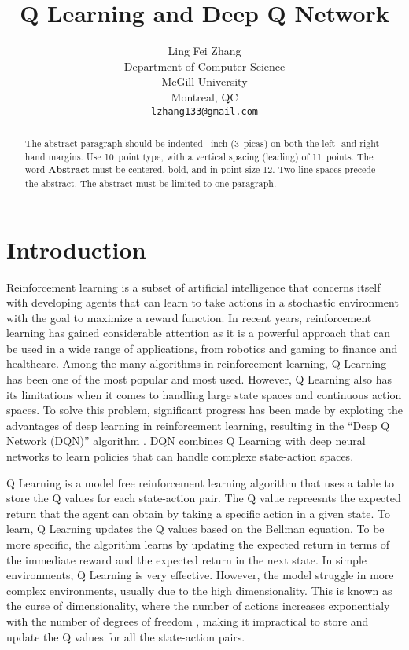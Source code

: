 \documentclass{article}
\title{Q Learning and Deep Q Network}
\author{%
      Ling Fei Zhang\\
      Department of Computer Science\\ McGill University\\ Montreal, QC \\
      \texttt{lzhang133@gmail.com} \\
}
\begin{document}
\maketitle

\begin{abstract}
      The abstract paragraph should be indented ~inch (3~picas) on
      both the left- and right-hand margins. Use 10~point type, with a vertical
      spacing (leading) of 11~points.  The word \textbf{Abstract} must be centered,
      bold, and in point size 12. Two line spaces precede the abstract. The abstract
      must be limited to one paragraph.
\end{abstract}

\section{Introduction}

Reinforcement learning is a subset of artificial intelligence that concerns
itself with developing agents that can learn to take actions in a stochastic
environment with the goal to maximize a reward function. In recent years,
reinforcement learning has gained considerable attention as it is a powerful
approach that can be used in a wide range of applications, from robotics and
gaming to finance and healthcare. Among the many algorithms in reinforcement
learning, Q Learning has been one of the most popular and most used. However, Q
Learning also has its limitations when it comes to handling large state spaces
and continuous action spaces. To solve this problem, significant progress has
been made by exploting the advantages of deep learning in reinforcement
learning, resulting in the ``Deep Q Network (DQN)'' algorithm
\cite{DBLP:journals/corr/MnihKSGAWR13}. DQN combines Q Learning with deep
neural networks to learn policies that can handle complexe state-action spaces.

Q Learning is a model free reinforcement learning algorithm that uses a table
to store the Q values for each state-action pair. The Q value repreesnts the
expected return that the agent can obtain by taking a specific action in a
given state. To learn, Q Learning updates the Q values based on the Bellman
equation. To be more specific, the algorithm learns by updating the expected
return in terms of the immediate reward and the expected return in the next
state. In simple environments, Q Learning is very effective. However, the model
struggle in more complex environments, usually due to the high dimensionality.
This is known as the curse of dimensionality, where the number of actions
increases exponentialy with the number of degrees of freedom
\cite{soft_update}, making it impractical to store and update the Q values for
all the state-action pairs.
\end{document}
